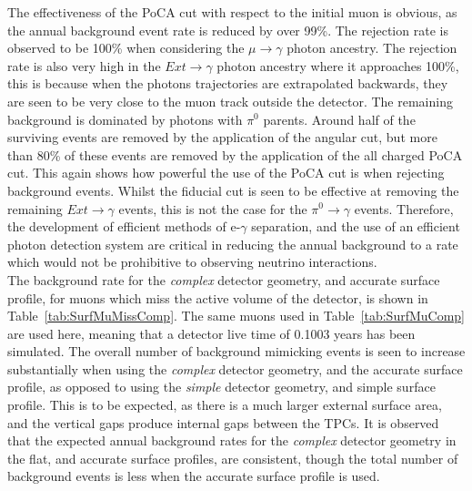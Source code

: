 The effectiveness of the PoCA cut with respect to the initial muon is obvious, as the annual background event rate is reduced by over 99\%. The rejection rate is observed to be 100\% when considering the $\mu\to\gamma$ photon ancestry. The rejection rate is also very high in the $Ext\to\gamma$ photon ancestry where it approaches 100\%, this is because when the photons trajectories are extrapolated backwards, they are seen to be very close to the muon track outside the detector. The remaining background is dominated by photons with $\pi^{0}$ parents. Around half of the surviving events are removed by the application of the angular cut, but more than 80\% of these events are removed by the application of the all charged PoCA cut. This again shows how powerful the use of the PoCA cut is when rejecting background events. Whilst the fiducial cut is seen to be effective at removing the remaining $Ext\to\gamma$ events, this is not the case for the $\pi^0\to\gamma$ events. Therefore, the development of efficient methods of e-$\gamma$ separation, and the use of an efficient photon detection system are critical in reducing the annual background to a rate which would not be prohibitive to observing neutrino interactions. \\

The background rate for the \emph{complex} detector geometry, and accurate surface profile, for muons which miss the active volume of the detector, is shown in Table~\ref{tab:SurfMuMissComp}. The same muons used in Table~\ref{tab:SurfMuComp} are used here, meaning that a detector live time of 0.1003 years has been simulated. The overall number of background mimicking events is seen to increase substantially  when using the \emph{complex} detector geometry, and the accurate surface profile, as opposed to using the \emph{simple} detector geometry, and simple surface profile. This is to be expected, as there is a much larger external surface area, and the vertical gaps produce internal gaps between the TPCs. It is observed that the expected annual background rates for the \emph{complex} detector geometry in the flat, and accurate surface profiles, are consistent, though the total number of background events is less when the accurate surface profile is used. \\

